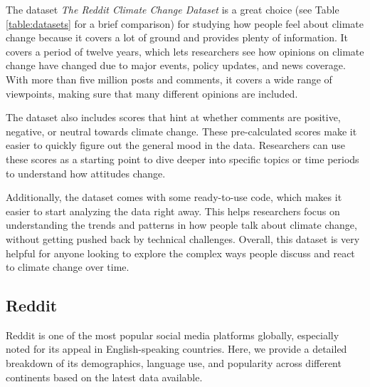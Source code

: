 The dataset \emph{The Reddit Climate Change Dataset} is a great choice (see Table \ref{table:datasets} for a brief comparison) for studying how people feel about climate change because it covers a lot of ground and provides plenty of information. It covers a period of twelve years, which lets researchers see how opinions on climate change have changed due to major events, policy updates, and news coverage. With more than five million posts and comments, it covers a wide range of viewpoints, making sure that many different opinions are included.

The dataset also includes scores that hint at whether comments are positive, negative, or neutral towards climate change. These pre-calculated scores make it easier to quickly figure out the general mood in the data. Researchers can use these scores as a starting point to dive deeper into specific topics or time periods to understand how attitudes change.

Additionally, the dataset comes with some ready-to-use code, which makes it easier to start analyzing the data right away. This helps researchers focus on understanding the trends and patterns in how people talk about climate change, without getting pushed back by technical challenges. Overall, this dataset is very helpful for anyone looking to explore the complex ways people discuss and react to climate change over time.

\subsection{Reddit}
Reddit is one of the most popular social media platforms globally, especially noted for its appeal in English-speaking countries. Here, we provide a detailed breakdown of its demographics, language use, and popularity across different continents based on the latest data available.

